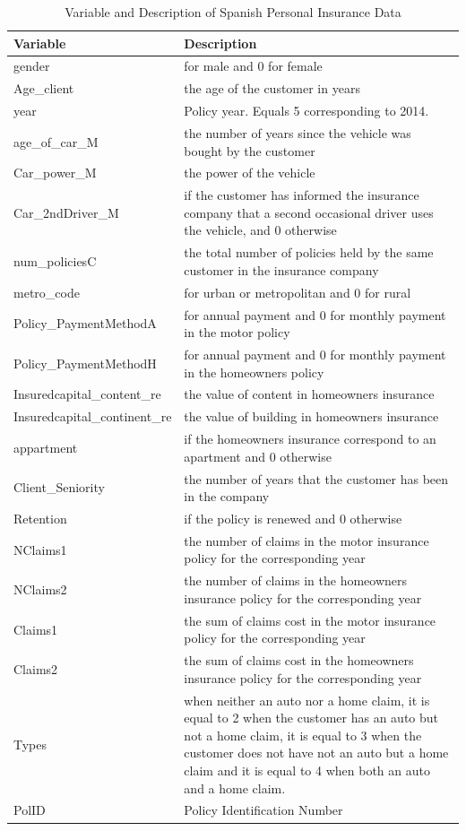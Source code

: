 \documentclass[
  12pt,
  krantz2]{Format/krantzNoCorner}
\begin{document}
\begin{table}[!h]
\centering\centering\centering
\caption{\label{tab:DescribeCover}Variable and Description of Spanish Personal Insurance Data}
\centering
\fontsize{10}{12}\selectfont
\begin{tabular}[t]{>{\raggedright\arraybackslash}p{4.25cm}>{\raggedright\arraybackslash}p{10cm}}
\toprule
Variable & Description\\
\midrule
gender & 1 for male and 0 for female\\
Age\_client & the age of the customer in years\\
year & Policy year. Equals 5 corresponding to 2014.\\
age\_of\_car\_M & the number of years since the vehicle was bought by the customer\\
Car\_power\_M & the power of the vehicle\\
\addlinespace
Car\_2ndDriver\_M & 1 if the customer has informed the insurance company that a second occasional driver uses the vehicle, and 0 otherwise\\
num\_policiesC & the total number of policies held by the same customer in the insurance company\\
metro\_code & 1 for urban or metropolitan and 0 for rural\\
Policy\_PaymentMethodA & 1 for annual payment and  0 for monthly payment in the motor policy\\
Policy\_PaymentMethodH & 1 for annual payment and  0 for monthly payment in the homeowners policy\\
\addlinespace
Insuredcapital\_content\_re & the value of content in homeowners insurance\\
Insuredcapital\_continent\_re & the value of building in homeowners insurance\\
appartment & 1 if the homeowners insurance correspond to an apartment and 0 otherwise\\
Client\_Seniority & the number of years that the customer has been in the company\\
Retention & 1 if the policy is renewed and 0 otherwise\\
\addlinespace
NClaims1 & the number of claims in the motor insurance policy for the corresponding year\\
NClaims2 & the number of claims in the homeowners insurance policy for the corresponding year\\
Claims1 & the sum of claims cost  in the motor insurance policy for the corresponding year\\
Claims2 & the sum of claims cost  in the homeowners insurance policy for the corresponding year\\
Types & 1 when neither an auto nor a home claim, it is equal to  2 when the customer has an auto but not a home claim, it is equal to 3 when the customer does not have  not an auto but a home claim and it is equal to  4 when  both an auto and a home claim.\\
\addlinespace
PolID & Policy Identification Number\\
\bottomrule
\end{tabular}
\end{table}
\end{document}
